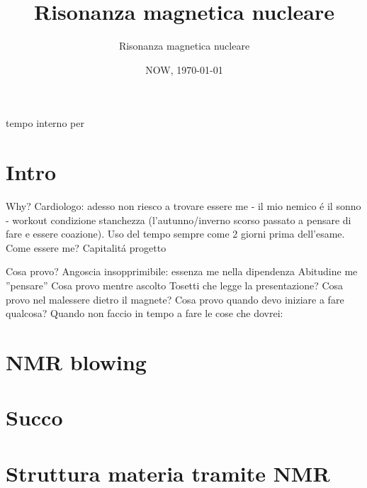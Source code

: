 \documentclass[10pt,xcolor={usenames},fleqn,mathserif,serif]{beamer}
\title{Risonanza magnetica nucleare}
\subtitle{Risonanza magnetica nucleare}
\date{NOW, \today}
\begin{document}


\begin{frame}
  \titlepage
\end{frame}

\begin{frame}{tempo interno per}
\tableofcontents[onlyparts]
\end{frame}


\part{Intro}

\begin{frame}[label={why}]{Why?}
Cardiologo: adesso non riesco a trovare essere me - il mio nemico \'e il sonno - workout condizione stanchezza (l'autunno/inverno scorso passato a pensare di fare e essere coazione).
Uso del tempo sempre come 2 giorni prima dell'esame.
Come essere me? Capitalit\'a progetto
\end{frame}

\begin{wordonframe}{Cosa provo?}
Angoscia insopprimibile: essenza me nella dipendenza
Abitudine me ''pensare''
Cosa provo mentre ascolto Tosetti che legge la presentazione?
Cosa provo nel malessere dietro il magnete?
Cosa provo quando devo iniziare a fare qualcosa?
Quando non faccio in tempo a fare le cose che dovrei: 
\end{wordonframe}

\part{NMR blowing}


\part{Succo}


\part{Struttura materia tramite NMR}




%
\end{document}
